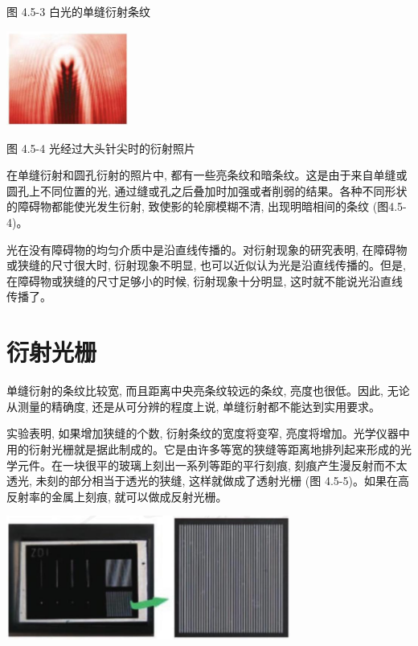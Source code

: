 \documentclass[10pt]{article}
\begin{document}
图 4.5-3 白光的单缝衍射条纹

\begin{center}
\includegraphics[max width=0.3\textwidth]{images/01910e4c-ebb8-7d2c-8f2f-2375bc1d2d12_110_247690.jpg}
\end{center}

图 4.5-4 光经过大头针尖时的衍射照片

在单缝衍射和圆孔衍射的照片中, 都有一些亮条纹和暗条纹。这是由于来自单缝或圆孔上不同位置的光, 通过缝或孔之后叠加时加强或者削弱的结果。各种不同形状的障碍物都能使光发生衍射, 致使影的轮廓模糊不清, 出现明暗相间的条纹 (图4.5-4)。

光在没有障碍物的均匀介质中是沿直线传播的。对衍射现象的研究表明, 在障碍物或狭缝的尺寸很大时, 衍射现象不明显, 也可以近似认为光是沿直线传播的。但是, 在障碍物或狭缝的尺寸足够小的时候, 衍射现象十分明显, 这时就不能说光沿直线传播了。

\section*{衍射光栅}

单缝衍射的条纹比较宽, 而且距离中央亮条纹较远的条纹, 亮度也很低。因此, 无论从测量的精确度, 还是从可分辨的程度上说, 单缝衍射都不能达到实用要求。

实验表明, 如果增加狭缝的个数, 衍射条纹的宽度将变窄, 亮度将增加。光学仪器中用的衍射光栅就是据此制成的。它是由许多等宽的狭缝等距离地排列起来形成的光学元件。在一块很平的玻璃上刻出一系列等距的平行刻痕, 刻痕产生漫反射而不太透光, 未刻的部分相当于透光的狭缝, 这样就做成了透射光栅 (图 4.5-5)。如果在高反射率的金属上刻痕, 就可以做成反射光栅。

\begin{center}
\includegraphics[max width=0.7\textwidth]{images/01910e4c-ebb8-7d2c-8f2f-2375bc1d2d12_110_180787.jpg}
\end{center}
\end{document}
